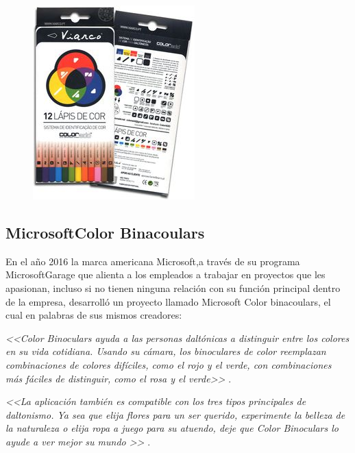 \documentclass[10pt]{article}
\begin{document}
\begin{figure}[H]
	\begin{center}
\includegraphics[scale = 0.45]{Imagenes/coloradd.jpg}
	\end{center} 
\end{figure}

\subsection{Microsoft\textregistered \space Color Binacoulars }
En el año 2016 la marca americana Microsoft\textregistered,\space a través de su programa Microsoft\textregistered \space Garage que alienta a los empleados a trabajar en proyectos que les apasionan, incluso si no tienen ninguna relación con su función principal dentro de la empresa, desarrolló un proyecto llamado Microsoft Color binacoulars, el cual en palabras de sus mismos creadores:

\setlength{\parskip}{2mm}

\textit{<<Color Binoculars ayuda a las personas daltónicas a distinguir entre los colores en su vida cotidiana. Usando su cámara, los binoculares de color reemplazan combinaciones de colores difíciles, como el rojo y el verde, con combinaciones más fáciles de distinguir, como el rosa y el verde>>} \cite{IEEEreferencias:Ref18}.

\setlength{\parskip}{2mm}

\textit{<<La aplicación también es compatible con los tres tipos principales de daltonismo. Ya sea que elija flores para un ser querido, experimente la belleza de la naturaleza o elija ropa a juego para su atuendo, deje que Color Binoculars lo ayude a ver mejor su mundo  >>} \cite{IEEEreferencias:Ref18}.
\end{document}
